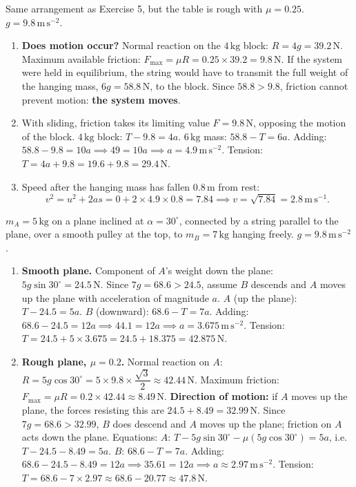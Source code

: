 \documentclass[11pt]{article}
\begin{document}
\begin{corrige}
Same arrangement as Exercise 5, but the table is rough with $\mu = 0.25$. $g = 9.8\,\mathrm{m\,s^{-2}}$.
\begin{enumerate}
\item \textbf{Does motion occur?} Normal reaction on the $4\,\mathrm{kg}$ block: $R = 4g = 39.2\,\mathrm{N}$.
Maximum available friction: $F_{\max} = \mu R = 0.25\times 39.2 = 9.8\,\mathrm{N}$.
If the system were held in equilibrium, the string would have to transmit the full weight of the hanging mass, $6g = 58.8\,\mathrm{N}$, to the block. Since $58.8 > 9.8$, friction cannot prevent motion: \textbf{the system moves}.
\item With sliding, friction takes its limiting value $F = 9.8\,\mathrm{N}$, opposing the motion of the block.
$4\,\mathrm{kg}$ block: $T - 9.8 = 4a$.
$6\,\mathrm{kg}$ mass: $58.8 - T = 6a$.
Adding: $58.8 - 9.8 = 10a \implies 49 = 10a \implies a = 4.9\,\mathrm{m\,s^{-2}}$.
Tension: $T = 4a + 9.8 = 19.6 + 9.8 = 29.4\,\mathrm{N}$.
\item Speed after the hanging mass has fallen $0.8\,\mathrm{m}$ from rest:
\[v^2 = u^2 + 2as = 0 + 2\times 4.9\times 0.8 = 7.84 \implies v = \sqrt{7.84} = 2.8\,\mathrm{m\,s^{-1}}.\]
\end{enumerate}
\end{corrige}

\begin{corrige}
$m_A = 5\,\mathrm{kg}$ on a plane inclined at $\alpha = 30^\circ$, connected by a string parallel to the plane, over a smooth pulley at the top, to $m_B = 7\,\mathrm{kg}$ hanging freely. $g = 9.8\,\mathrm{m\,s^{-2}}$.
\begin{enumerate}
\item \textbf{Smooth plane.}
Component of $A$'s weight down the plane: $5g\sin30^\circ = 24.5\,\mathrm{N}$. Since $7g = 68.6 > 24.5$, assume $B$ descends and $A$ moves up the plane with acceleration of magnitude $a$.
$A$ (up the plane): $T - 24.5 = 5a$.
$B$ (downward): $68.6 - T = 7a$.
Adding: $68.6 - 24.5 = 12a \implies 44.1 = 12a \implies a = 3.675\,\mathrm{m\,s^{-2}}$.
Tension: $T = 24.5 + 5\times 3.675 = 24.5 + 18.375 = 42.875\,\mathrm{N}$.
\item \textbf{Rough plane, $\mu = 0.2$.}
Normal reaction on $A$: $R = 5g\cos30^\circ = 5\times 9.8\times \dfrac{\sqrt{3}}{2} \approx 42.44\,\mathrm{N}$.
Maximum friction: $F_{\max} = \mu R = 0.2\times 42.44 \approx 8.49\,\mathrm{N}$.
\textbf{Direction of motion:} if $A$ moves up the plane, the forces resisting this are $24.5 + 8.49 = 32.99\,\mathrm{N}$. Since $7g = 68.6 > 32.99$, $B$ does descend and $A$ moves up the plane; friction on $A$ acts down the plane.
Equations:
$A$: $T - 5g\sin30^\circ - \mu(5g\cos30^\circ) = 5a$, i.e. $T - 24.5 - 8.49 = 5a$.
$B$: $68.6 - T = 7a$.
Adding: $68.6 - 24.5 - 8.49 = 12a \implies 35.61 = 12a \implies a \approx 2.97\,\mathrm{m\,s^{-2}}$.
Tension: $T = 68.6 - 7\times 2.97 \approx 68.6 - 20.77 \approx 47.8\,\mathrm{N}$.
\end{enumerate}
\end{corrige}
\end{document}
